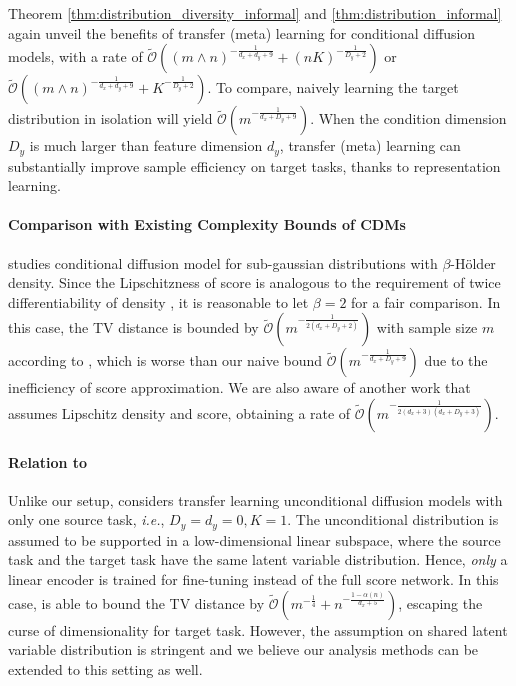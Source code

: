 \documentclass{article}
\numberwithin{equation}{section}
\theoremstyle{definition}
\begin{document}
Theorem \ref{thm:distribution_diversity_informal} and \ref{thm:distribution_informal} again unveil the benefits of transfer (meta) learning for conditional diffusion models, with a rate of $\widetilde{\mathcal{O}}((m\wedge n)^{-\frac{1}{d_x+d_y+9}}+(nK)^{-\frac{1}{D_y+2}})$ or $\widetilde{\mathcal{O}}((m\wedge n)^{-\frac{1}{d_x+d_y+9}}+K^{-\frac{1}{D_y+2}})$.
To compare, naively learning the target distribution in isolation will yield $\widetilde{\mathcal{O}}(m^{-\frac{1}{d_x+D_y+9}})$.
When the condition dimension $D_y$ is much larger than feature dimension $d_y$, transfer (meta) learning can substantially improve sample efficiency on target tasks, thanks to representation learning.

\paragraph{Comparison with Existing Complexity Bounds of CDMs}

\citet{fu2024unveil} studies conditional diffusion model for sub-gaussian distributions with $\beta$-H\"older density.
Since the Lipschitzness of score is analogous to the requirement of twice differentiability of density \citep{wibisono2024optimal}, it is reasonable to let $\beta=2$ for a fair comparison.
In this case, the TV distance is bounded by $\widetilde{\mathcal{O}}(m^{-\frac{1}{2(d_x+D_y+2)}})$ with sample size $m$ according to \citet{fu2024unveil}, which is worse than our naive bound $\widetilde{\mathcal{O}}(m^{-\frac{1}{d_x+D_y+9}})$ due to the inefficiency of score approximation.
We are also aware of another work \citep{jiao2024model} that assumes Lipschitz density and score, obtaining a rate of $\widetilde{\mathcal{O}}(m^{-\frac{1}{2(d_x+3)(d_x+D_y+3)}})$.

\paragraph{Relation to \citet{yang2024fewshot}}

Unlike our setup, \citet{yang2024fewshot} considers transfer learning unconditional diffusion models with only one source task, \textit{i.e.}, $D_y=d_y=0,K=1$.
The unconditional distribution is assumed to be supported in a low-dimensional linear subspace, where the source task and the target task have the same latent variable distribution. 
Hence, \textit{only} a linear encoder is trained for fine-tuning instead of the full score network. 
In this case, \citet{yang2024fewshot} is able to bound the TV distance by $\widetilde{\mathcal{O}}(m^{-\frac{1}{4}}+n^{-\frac{1-\alpha(n)}{d_x+5}})$, escaping the curse of dimensionality for target task.
However, the assumption on shared latent variable distribution is stringent and we believe our analysis methods can be extended to this setting as well.
\end{document}
